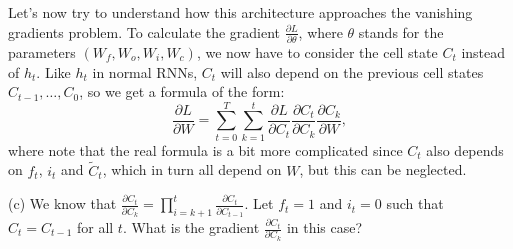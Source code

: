 \documentclass[12pt]{article}
\begin{document}
 \noindent Let’s now try to understand how this architecture approaches the vanishing gradients problem. To calculate the gradient $\frac{\partial L}{\partial \theta}$, where $\theta$ stands for the parameters $(W_f, W_o, W_i, W_c)$, we now have to consider the cell state $C_t$ instead of $h_t$. Like $h_t$ in normal RNNs, $C_t$ will also depend on the previous cell states $C_{t-1}, \ldots, C_0$, so we get a formula of the form:
 \begin{equation*}
 \frac{\partial L}{\partial W} = \sum_{t=0}^T \sum_{k=1}^t \frac{\partial L}{\partial C_t} \frac{\partial C_t}{\partial C_k} \frac{\partial C_k}{\partial W},
 \end{equation*}
 where note that the real formula is a bit more complicated since $C_t$ also depends on $f_t$, $i_t$ and $\widetilde{C}_t$, which in turn all depend on $W$, but this can be neglected.
 
 (c) We know that $\frac{\partial C_t}{\partial C_k} = \prod_{i=k+1}^t \frac{\partial C_t}{\partial C_{t-1}}$. Let $f_t=1$ and $i_t=0$ such that $C_t = C_{t-1}$ for all $t$. What is the gradient $\frac{\partial C_t}{\partial C_k}$ in this case?
 
 
 
\end{document}
